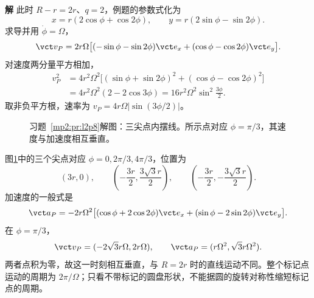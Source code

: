\documentclass[11pt,openany,fontset=fandol]{ctexbook}
\theoremstyle{definition}\newtheorem{example}{例}[chapter]\newtheorem{exercise}{习题}[chapter]
\newcommand{\SolutionStart}{\par\medskip\ifdim\pagetotal>0pt\ifdim\dimexpr\pagegoal-\pagetotal\relax<3\baselineskip\newpage\fi\fi\noindent\textbf{解}\quad\ignorespaces}
\newenvironment{solution}{\SolutionStart}{\par\medskip}
\begin{document}
\begin{solution}
此时 $R-r=2r$、$q=2$，例题的参数式化为
\[
x=r(2\cos\phi+\cos2\phi),\qquad
y=r(2\sin\phi-\sin2\phi).
\]
求导并用 $\dot\phi=\Omega$，
\[
\vct v_P=2r\Omega\bigl[(-\sin\phi-\sin2\phi)\vct e_x
+(\cos\phi-\cos2\phi)\vct e_y\bigr].
\]
对速度两分量平方相加，
\[
\begin{aligned}
v_P^2&=4r^2\Omega^2\bigl[(\sin\phi+\sin2\phi)^2
+(\cos\phi-\cos2\phi)^2\bigr]\\
&=4r^2\Omega^2(2-2\cos3\phi)
=16r^2\Omega^2\sin^2\frac{3\phi}{2}.
\end{aligned}
\]
取非负平方根，速率为 $v_P=4r\Omega|\sin(3\phi/2)|$。

\begin{figure}[H]\centering
{}
\caption{习题~\ref{mp2:pr:l2p8}解图：三尖点内摆线。所示点对应 $\phi=\pi/3$，其速度与加速度相互垂直。}\label{mp2:fig:l2p8-s}
\end{figure}

图\ref{mp2:fig:l2p8-s}中的三个尖点对应 $\phi=0,2\pi/3,4\pi/3$，位置为
\[
(3r,0),\qquad
\left(-\frac{3r}{2},\frac{3\sqrt3r}{2}\right),\qquad
\left(-\frac{3r}{2},-\frac{3\sqrt3r}{2}\right).
\]
加速度的一般式是
\[
\vct a_P=-2r\Omega^2\bigl[(\cos\phi+2\cos2\phi)\vct e_x
+(\sin\phi-2\sin2\phi)\vct e_y\bigr].
\]
在 $\phi=\pi/3$，
\[
\vct v_P=(-2\sqrt3r\Omega,2r\Omega),\qquad
\vct a_P=(r\Omega^2,\sqrt3r\Omega^2).
\]
两者点积为零，故这一时刻相互垂直，与 $R=2r$ 时的直线运动不同。整个标记点运动的周期为 $2\pi/\Omega$；只看不带标记的圆盘形状，不能据圆的旋转对称性缩短标记点的周期。

\end{solution}
\end{document}
